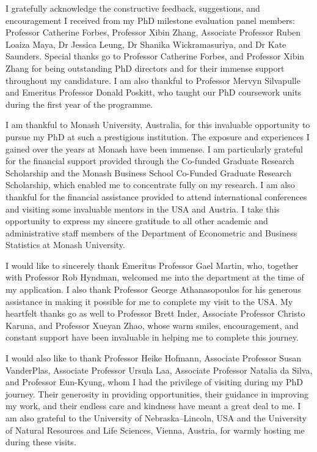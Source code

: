 \documentclass[
  11pt,
  a4paper,
]{report}
\begin{document}
I gratefully acknowledge the constructive feedback, suggestions, and
encouragement I received from my PhD milestone evaluation panel members:
Professor Catherine Forbes, Professor Xibin Zhang, Associate Professor
Ruben Loaiza Maya, Dr Jessica Leung, Dr Shanika Wickramasuriya, and Dr
Kate Saunders. Special thanks go to Professor Catherine Forbes, and
Professor Xibin Zhang for being outstanding PhD directors and for their
immense support throughout my candidature. I am also thankful to
Professor Mervyn Silvapulle and Emeritus Professor Donald Poskitt, who
taught our PhD coursework units during the first year of the programme.

I am thankful to Monash University, Australia, for this invaluable
opportunity to pursue my PhD at such a prestigious institution. The
exposure and experiences I gained over the years at Monash have been
immense. I am particularly grateful for the financial support provided
through the Co-funded Graduate Research Scholarship and the Monash
Business School Co-Funded Graduate Research Scholarship, which enabled
me to concentrate fully on my research. I am also thankful for the
financial assistance provided to attend international conferences and
visiting some invaluable mentors in the USA and Austria. I take this
opportunity to express my sincere gratitude to all other academic and
administrative staff members of the Department of Econometric and
Business Statistics at Monash University.

I would like to sincerely thank Emeritus Professor Gael Martin, who,
together with Professor Rob Hyndman, welcomed me into the department at
the time of my application. I also thank Professor George Athanasopoulos
for his generous assistance in making it possible for me to complete my
visit to the USA. My heartfelt thanks go as well to Professor Brett
Inder, Associate Professor Christo Karuna, and Professor Xueyan Zhao,
whose warm smiles, encouragement, and constant support have been
invaluable in helping me to complete this journey.

I would also like to thank Professor Heike Hofmann, Associate Professor
Susan VanderPlas, Associate Professor Ursula Laa, Associate Professor
Natalia da Silva, and Professor Eun-Kyung, whom I had the privilege of
visiting during my PhD journey. Their generosity in providing
opportunities, their guidance in improving my work, and their endless
care and kindness have meant a great deal to me. I am also grateful to
the University of Nebraska--Lincoln, USA and the University of Natural
Resources and Life Sciences, Vienna, Austria, for warmly hosting me
during these visits.
\end{document}
